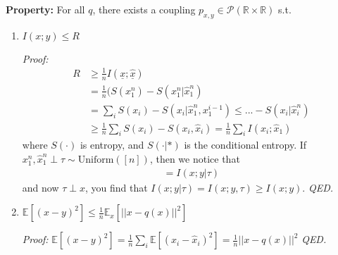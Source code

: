 \textbf{Property:}
For all $q$, there exists a coupling $p_{x,y} \in \mathcal P(\mathbb R \times \mathbb R)$ s.t.
\begin{enumerate}
	\item $I(x; y) \leq R$
	
	\emph{Proof:} 
	\begin{align}
		R & \geq \frac{1}{n} I(\underline x ; \hat{ \underline x}) \\
		& = \frac{1}{n} (S(x_1^n) - S(x_1^n | \hat x_1^n)\\
		& = \sum_i S(x_i) - S(x_i | \hat x_1^n, x^{i-1}_1) \leq ... - S(x_i | \hat x_i^n)\\
		& \geq \frac{1}{n} \sum_i S(x_i) - S(x_i, \hat x_i) = \frac{1}{n} \sum_i I(x_i ; \hat x_1)
	\end{align}
	where $S(\cdot)$ is entropy, and $S(\cdot | *)$ is the conditional entropy. If $x_1^n, \hat x_1^n \perp \tau \sim \text{Uniform}([n])$, then we notice that 
	\begin{align}
		= I(x; y | \tau)
	\end{align}
	and now $\tau \perp x$, you find that $I(x; y | \tau) = I(x; y, \tau)  \geq I(x;y)$. \emph{QED.}
	\item $\mathbb E[(x-y)^2] \leq \frac{1}{n} \mathbb E_x [||x - q(x)||^2]$
	
	\emph{Proof:} $\mathbb E[(x-y)^2] = \frac{1}{n} \sum_i \mathbb E[(x_i - \hat x_i)^2] = \frac{1}{n} ||x-q(x)||^2 $ \emph{QED.}
\end{enumerate}

